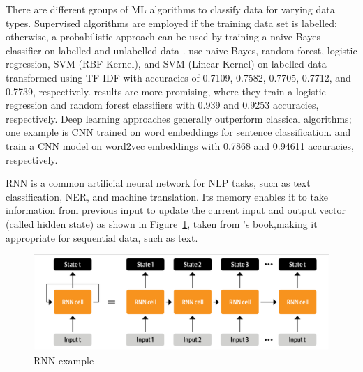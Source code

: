 There are different groups of \ac{ML} algorithms to classify data for varying data types. Supervised
algorithms are employed if the training data set is labelled; otherwise, a probabilistic approach
can be used by training a naive Bayes classifier on  labelled and unlabelled data
\cite{liDisasterResponseAided2018}.  use naive Bayes,
random forest, logistic regression, \ac{SVM} (RBF Kernel), and \ac{SVM} (Linear Kernel) on labelled
data transformed using \ac{TF-IDF} with accuracies of 0.7109, 0.7582, 0.7705, 0.7712, and 0.7739,
respectively.  results are more promising,
where they train a logistic regression and random forest classifiers with 0.939 and 0.9253
accuracies, respectively. Deep learning approaches  generally outperform classical algorithms; one
example is \ac{CNN} trained on word embeddings for sentence classification.
 and
 train a \ac{CNN} model on word2vec
embeddings with 0.7868 and 0.94611 accuracies, respectively.

\ac{RNN} \cite{hopfieldNeuralNetworksPhysical1982} is a common artificial neural network for
\ac{NLP} tasks, such as text classification, \ac{NER}, and machine translation. Its memory enables
it to take information from previous input to update the current input and output vector (called
hidden state) as shown in Figure~\ref{fig:rnn_example}, taken from \citeauthor{tunstallNaturalLanguageProcessing2022}'s book\cite{tunstallNaturalLanguageProcessing2022},making it appropriate for sequential data, such as text. 

\begin{figure}[H]
\begin{center}
  \includegraphics[width=12cm,trim={0.1cm 0.1cm 0.1cm 0.1cm},clip]{./images/unrolling_rnn.png}
\end{center}
\caption{RNN example \cite{tunstallNaturalLanguageProcessing2022}}
\label{fig:rnn_example}
\end{figure}

